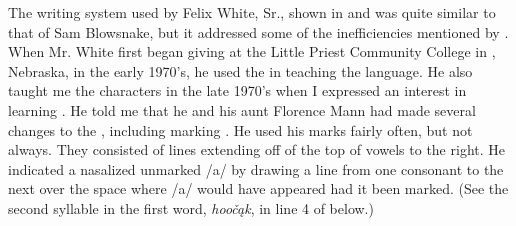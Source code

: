 \documentclass[output=paper]{LSP/langsci}
\begin{document}
The  writing system used by Felix White, Sr., shown in  and  was quite similar to that of Sam Blowsnake, but it addressed some of the inefficiencies mentioned by \citeauthor{Susman1939}. When Mr. White first began giving   at the Little Priest Community College in , Nebraska, in the early 1970's, he used the  in teaching the language. He also taught me the  characters in the late 1970's when I expressed an interest in learning . He told me that he and his aunt Florence Mann had made several changes to the , including marking . He used his  marks fairly often, but not always. They consisted of lines extending off of the top of vowels to the right. He indicated a nasalized unmarked /a/ by drawing a line from one consonant to the next over the space where /a/ would have appeared had it been marked. (See the second syllable in the first word, \emph{hoo\v{c}\k{a}k}, in line 4 of  below.)
\end{document}
